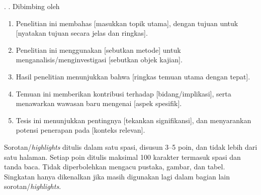 

\noindent
\MakeUppercase{\NamaPenulis}. \JudulTesis\unskip. Dibimbing oleh
\DaftarPembimbingKapital

\begin{enumerate}[leftmargin=0.5cm,labelwidth=0.25cm,labelsep=0.25cm,
  align=left,itemsep=0pt,parsep=0pt,topsep=12pt,partopsep=0pt]
  \item Penelitian ini membahas [masukkan topik utama], dengan tujuan untuk
    [nyatakan tujuan secara jelas dan ringkas].
  \item Penelitian ini menggunakan [sebutkan metode] untuk
    menganalisis/menginvestigasi [sebutkan objek kajian].
  \item Hasil penelitian menunjukkan bahwa [ringkas temuan utama dengan tepat].
  \item Temuan ini memberikan kontribusi terhadap [bidang/implikasi], serta
    menawarkan wawasan baru mengenai [aspek spesifik].
  \item Tesis ini menunjukkan pentingnya [tekankan signifikansi], dan
    menyarankan potensi penerapan pada [konteks relevan].
\end{enumerate}

\vspace{10pt}

\noindent
Sorotan/\textit{highlights} ditulis dalam satu spasi, disusun 3--5 poin, dan
tidak lebih dari satu halaman. Setiap poin ditulis maksimal 100 karakter
termasuk spasi dan tanda baca. Tidak diperbolehkan mengacu pustaka, gambar,
dan tabel. Singkatan hanya dikenalkan jika masih digunakan lagi dalam bagian
lain sorotan/\textit{highlights}.


